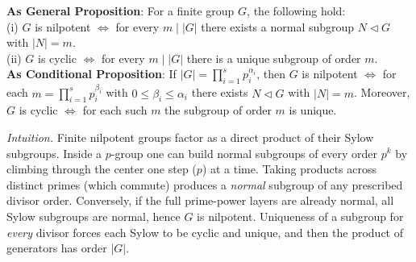 \documentclass[12pt]{article}
\theoremstyle{definition}
\begin{document}
\noindent\textbf{As General Proposition}: For a finite group $G$, the following hold: \\
(i) $G$ is nilpotent $\iff$ for every $m\mid |G|$ there exists a normal subgroup $N\lhd G$ with $|N|=m$.\\
(ii) $G$ is cyclic $\iff$ for every $m\mid |G|$ there is a unique subgroup of order $m$.\\

\noindent\textbf{As Conditional Proposition}: If $|G|=\prod_{i=1}^s p_i^{\alpha_i}$, then $G$ is nilpotent $\iff$ for each $m=\prod_{i=1}^s p_i^{\beta_i}$ with $0\le \beta_i\le \alpha_i$ there exists $N\lhd G$ with $|N|=m$. Moreover, $G$ is cyclic $\iff$ for each such $m$ the subgroup of order $m$ is unique.\\

\newpage

\dotfill

\emph{Intuition.} Finite nilpotent groups factor as a direct product of their Sylow subgroups. Inside a $p$-group one can build normal subgroups of every order $p^k$ by climbing through the center one step ($p$) at a time. Taking products across distinct primes (which commute) produces a \emph{normal} subgroup of any prescribed divisor order. Conversely, if the full prime-power layers are already normal, all Sylow subgroups are normal, hence $G$ is nilpotent. Uniqueness of a subgroup for \emph{every} divisor forces each Sylow to be cyclic and unique, and then the product of generators has order $|G|$.\\

\dotfill
\end{document}
